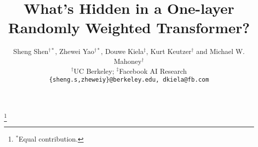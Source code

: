 \documentclass[11pt]{article}
\title{What’s Hidden in a One-layer Randomly Weighted Transformer?}
\author{
Sheng Shen$^{\dagger*}$, Zhewei Yao$^{\dagger*}$,  Douwe Kiela$^\ddagger$, Kurt Keutzer$^\dagger$ and Michael W. Mahoney$^\dagger$\\
 $^\dagger$UC Berkeley; $^\ddagger$Facebook AI Research\\
 \texttt{\{sheng.s,zheweiy\}@berkeley.edu, dkiela@fb.com}
}
\newcommand\blfootnote[1]{%
  \begingroup
  \renewcommand\thefootnote{}\footnote{#1}%
  \addtocounter{footnote}{-1}%
  \endgroup
}
\begin{document}
\maketitle


\blfootnote{$^*$Equal contribution.}









\clearpage
\end{document}

